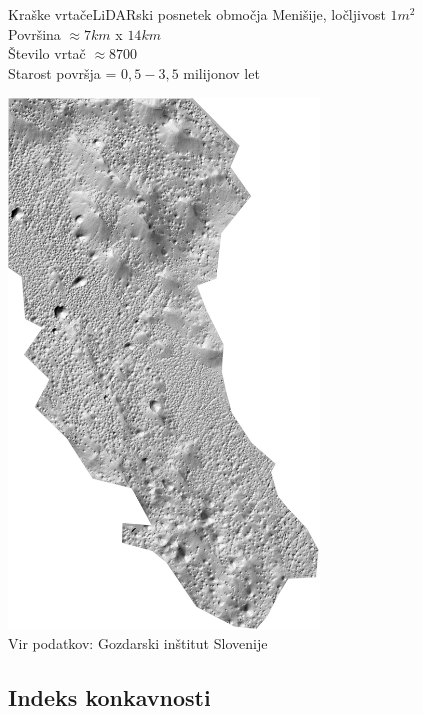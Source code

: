 \documentclass{beamer}
\begin{document}
\begin{frame}{Kraške vrtače}{LiDARski posnetek območja Menišije, ločljivost $1m^2$ \\ Površina $\approx 7 km$ x $14 km$ \\ Število vrtač $\approx 8700$ \\ Starost površja = $0,5 - 3,5$ milijonov let}
\begin{center}
  \hspace*{-1cm}\includegraphics[width=0.62\textwidth,angle=90]{slike/menisija-relief}
  \tiny{\\Vir podatkov: Gozdarski inštitut Slovenije}
\end{center}
\end{frame}

\subsection{Indeks konkavnosti}
\end{document}

